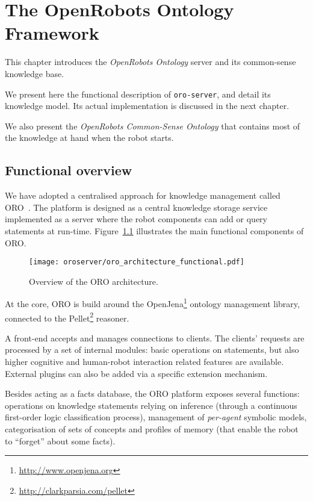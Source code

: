 \chapter{The OpenRobots Ontology Framework}
\label{chapt|oroserver}

This chapter introduces the \emph{OpenRobots Ontology} server and its
common-sense knowledge base.

We present here the functional description of {\tt oro-server}, and detail
its knowledge model. Its actual implementation is discussed in the next
chapter.

We also present the \emph{OpenRobots Common-Sense Ontology} that contains most
of the knowledge at hand when the robot starts.

\section{Functional overview}
\label{sect|functional-overview}

We have adopted a centralised approach for knowledge management called
ORO~\cite{Lemaignan2010}. The platform is designed as a central
knowledge storage service implemented as a server where the robot
components can add or query statements at run-time. Figure~\ref{fig|oro-overview}
illustrates the main functional components of ORO.

\begin{figure}
\centering
  \texttt{[image: oroserver/oro\_architecture\_functional.pdf]}
  \caption{Overview of the ORO architecture.}
  \label{fig|oro-overview}
\end{figure}

At the core, ORO is build around the
OpenJena\footnote{\url{http://www.openjena.org}} ontology management library,
connected to the Pellet\footnote{\url{http://clarkparsia.com/pellet}}
reasoner.

A front-end accepts and manages connections to clients. The clients' requests
are processed by a set of internal modules: basic operations on statements, but
also higher cognitive and human-robot interaction related features are
available. External plugins can also be added via a specific extension
mechanism.

Besides acting as a facts database, the ORO platform exposes several
functions: operations on knowledge statements relying on inference (through a
continuous first-order logic classification process), management of
\emph{per-agent} symbolic models, categorisation of sets of concepts
and profiles of memory (that enable the robot to ``forget'' about some facts).

